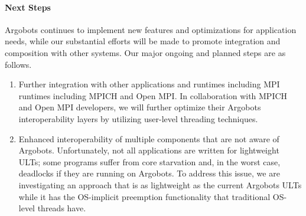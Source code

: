 \paragraph{Next Steps}

Argobots continues to implement new features and optimizations for
application needs, while our substantial efforts will be made to
promote integration and composition with other systems. Our major
ongoing and planned steps are as follows.

\begin{enumerate}

\item Further integration with other applications and runtimes
including MPI runtimes including MPICH and Open MPI.  In collaboration
with MPICH and Open MPI developers, we will further optimize their
Argobots interoperability layers by utilizing user-level threading
techniques.

\item Enhanced interoperability of multiple components that are not
aware of Argobots.  Unfortunately, not all applications are written
for lightweight ULTs; some programs suffer from core starvation and,
in the worst case, deadlocks if they are running on Argobots.  To
address this issue, we are investigating an approach that is as
lightweight as the current Argobots ULTs while it has the OS-implicit
preemption functionality that traditional OS-level threads have.

\end{enumerate}
